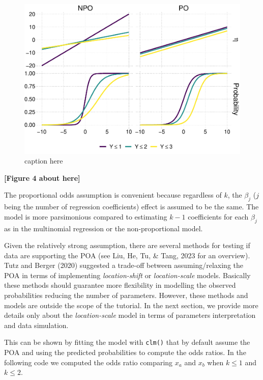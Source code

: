 \documentclass[
  man,floatsintext]{apa6}
\begin{document}
\begin{figure}

{\centering \includegraphics{paper-new_files/figure-latex/fig-prop-odds-1} 

}

\caption{caption here}\label{fig:fig-prop-odds}
\end{figure}

\begin{center}\textbf{[Figure 4 about here]} \end{center}

\normalsize

The proportional odds assumption is convenient because regardless of \(k\), the \(\beta_j\) (\(j\) being the number of regression coefficients) effect is assumed to be the same. The model is more parsimonious compared to estimating \(k - 1\) coefficients for each \(\beta_j\) as in the multinomial regression or the non-proportional model.

Given the relatively strong assumption, there are several methods for testing if data are supporting the POA (see Liu, He, Tu, \& Tang, 2023 for an overview). Tutz and Berger (2020) suggested a trade-off between assuming/relaxing the POA in terms of implementing \emph{location-shift} or \emph{location-scale} models. Basically these methods should guarantee more flexibility in modelling the observed probabilities reducing the number of parameters. However, these methods and models are outside the scope of the tutorial. In the next section, we provide more details only about the \emph{location-scale} model in terms of parameters interpretation and data simulation.

This can be shown by fitting the model with \texttt{clm()} that by default assume the POA and using the predicted probabilities to compute the odds ratios. In the following code we computed the odds ratio comparing \(x_a\) and \(x_b\) when \(k \leq 1\) and \(k \leq 2\).
\end{document}
